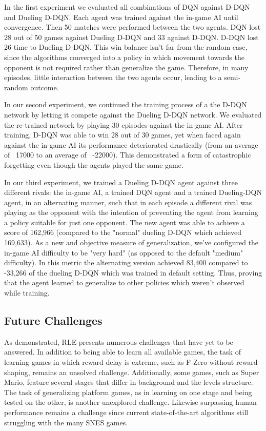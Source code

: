 \documentclass{article}
\begin{document}
In the first experiment we evaluated all combinations of DQN against D-DQN and Dueling D-DQN. 
Each agent was trained against the in-game AI until convergence. Then 50 matches were performed between the two agents. DQN lost 28 out of 50 games against Dueling D-DQN and 33 against D-DQN. 
D-DQN lost 26 time to Dueling D-DQN. 
This win balance isn't far from the random case, since the algorithms converged into a policy in which movement towards the opponent is not required rather than generalize the game. 
Therefore, in many episodes, little interaction between the two agents occur, leading to a semi-random outcome.

In our second experiment, we continued the training process of a the D-DQN network by letting it compete against the Dueling D-DQN network. We evaluated the re-trained network by playing 30 episodes against the in-game AI. After training, D-DQN was able to win 28 out of 30 games, yet when faced again against the in-game AI its performance deteriorated drastically (from an average of ~17000 to an average of ~-22000). This demonstrated a form of catastrophic forgetting \citep{goodfellow2013empirical} even though the agents played the same game.


In our third experiment, we trained a Dueling D-DQN agent against three different rivals: the in-game AI, a trained DQN agent and a trained Dueling-DQN agent, in an alternating manner, such that in each episode a different rival was playing as the opponent with the intention of preventing the agent from learning a policy suitable for just one opponent.
The new agent was able to achieve a score of 162,966 (compared to the "normal" dueling D-DQN which achieved 169,633).
As a new and objective measure of generalization, we've configured the in-game AI difficulty to be "very hard" (as opposed to the default "medium" difficulty).
In this metric the alternating version achieved 83,400 compared to -33,266 of the dueling D-DQN which was trained in default setting. Thus, proving that the agent learned to generalize to other policies which weren't observed while training.


\subsection{Future Challenges}
As demonstrated, RLE presents numerous challenges that have yet to be answered. In addition to being able to learn all available games, the task of learning games in which reward delay is extreme, such as F-Zero without reward shaping, remains an unsolved challenge. 
Additionally, some games, such as Super Mario, feature several stages that differ in background and the levels structure. The task of generalizing platform games, as in learning on one stage and being tested on the other, is another unexplored challenge.
Likewise surpassing human performance remains a challenge since current state-of-the-art algorithms still struggling with the many SNES games.
\end{document}
